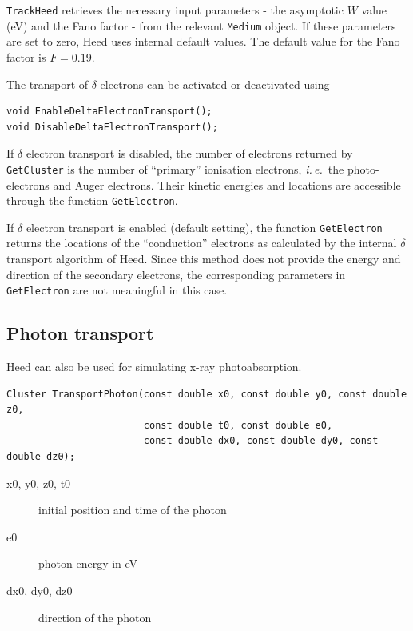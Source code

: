 \texttt{TrackHeed} retrieves the necessary input parameters - the 
asymptotic \(W\) value (eV) and the Fano factor - 
from the relevant \texttt{Medium} object. 
If these parameters are set to zero, Heed uses internal default values. 
The default value for the Fano factor is \(F = 0.19\).

The transport of \(\delta\) electrons can be activated or deactivated 
using
\begin{lstlisting}
void EnableDeltaElectronTransport();
void DisableDeltaElectronTransport();
\end{lstlisting} 

If \(\delta\) electron transport is disabled, 
the number of electrons returned by \texttt{GetCluster} is 
the number of ``primary'' ionisation electrons, 
\textit{i.\,e.}~the photo-electrons and Auger electrons. 
Their kinetic energies and locations are accessible 
through the function \texttt{GetElectron}.

If \(\delta\) electron transport is enabled (default setting), 
the function \texttt{GetElectron} returns the 
locations of the ``conduction'' electrons as calculated by the 
internal \(\delta\) transport algorithm of Heed. 
Since this method does not provide the energy and direction of the 
secondary electrons, the corresponding parameters in 
\texttt{GetElectron} are not meaningful in this case. 

\subsection{Photon transport}

Heed can also be used for simulating x-ray photoabsorption. 
\begin{lstlisting}
Cluster TransportPhoton(const double x0, const double y0, const double z0,
                        const double t0, const double e0,
                        const double dx0, const double dy0, const double dz0);
\end{lstlisting}
\begin{description}
\item[x0, y0, z0, t0] initial position and time of the photon
\item[e0] photon energy in eV
\item[dx0, dy0, dz0] direction of the photon
\end{description}

